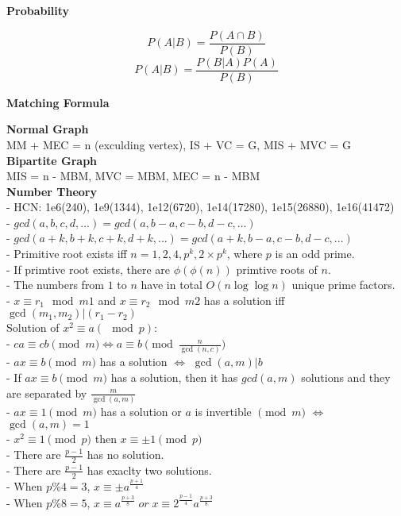 \textbf{Probability}

\[ P(A|B) = \frac{P(A \cap B)}{P(B)} \]
\[ P(A|B) = \frac{P(B|A)P(A)}{P(B)} \]

\textbf{Matching Formula}

\textbf{Normal Graph} \\
MM + MEC = n (exculding vertex), IS + VC = G, MIS + MVC = G \\

\textbf{Bipartite Graph} \\
MIS = n - MBM, MVC = MBM, MEC = n - MBM \\

\textbf{Number Theory} \\
- HCN: 1e6(240), 1e9(1344), 1e12(6720), 1e14(17280), 1e15(26880), 1e16(41472) \\
- \( gcd(a, b, c, d, ...) = gcd(a, b - a, c - b, d - c, ...) \) \\
- \( gcd(a + k, b + k, c + k, d + k, ...) = gcd(a + k, b - a, c - b, d - c, ...) \) \\
- Primitive root exists iff \( n = 1, 2, 4, p^k, 2\times p^k \), where \( p \) is an odd prime. \\
- If primtive root exists, there are \( \phi(\phi(n)) \) primtive roots of \( n \). \\
- The numbers from \( 1 \) to \( n \) have in total \( O(n\log\log n) \) unique prime factors. \\
- \( x \equiv r_1 \mod m1 \) and \( x \equiv r_2 \mod m2 \) has a solution iff \( \gcd(m_1, m_2) | (r_1 - r_2) \) \\
Solution of \( x^2 \equiv a (\mod p) \):\\
- \( ca \equiv cb \pmod{m} \iff a \equiv b \pmod{ \frac{n}{\gcd(n, c)}} \) \\
- \( ax \equiv b \pmod{m} \) has a solution \( \iff \) \( \gcd(a, m) | b \) \\
- If \( ax \equiv b \pmod{m} \) has a solution, then it has \( gcd(a, m) \) solutions and they are separated by \( \frac{m}{\gcd(a, m)} \) \\
- \( ax \equiv 1 \pmod{m} \) has a solution or \( a \) is invertible \( \pmod{m} \) \( \iff \) \(\gcd(a, m) = 1 \) \\
- \( x^2 \equiv 1 \pmod{p} \) then \( x \equiv \pm 1 \pmod{p} \) \\
- There are \( \frac{p - 1}{2} \) has no solution. \\
- There are \( \frac{p - 1}{2} \) has exaclty two solutions. \\
- When \( p \% 4 = 3 \), \( x \equiv \pm a^{\frac{p + 1}{4}} \) \\
- When \( p \% 8 = 5 \), \( x \equiv a^{\frac{p + 3}{8}} \; or \; x \equiv 2^{\frac{p - 1}{4}} a^{\frac{p + 3}{8}} \)

